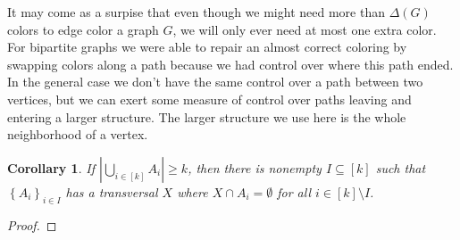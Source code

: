 \documentclass[openany]{tufte-book} %
\theoremstyle{plain}
\newtheorem{corollary}{Corollary}
\newcommand{\set}[1]{\left\{ #1 \right\}}
\newcommand{\card}[1]{\left|#1\right|}
\newcommand{\irange}[1]{\left[#1\right]}
\begin{document}
It may come as a surpise that even though we might need more than $\Delta(G)$ colors to edge color a graph $G$, we will only ever need at most one extra color.
For bipartite graphs we were able to repair an almost correct coloring by swapping colors along a path because we had control over where this path ended.  In the
general case we don't have the same control over a path between two vertices, but we can exert some measure of control over paths leaving and entering a larger structure. 
The larger structure we use here is the whole neighborhood of a vertex.

\begin{corollary}\label{TransversalCorollary}
If $\card{\bigcup_{i \in \irange{k}} A_i} \ge k$, then there is nonempty $I \subseteq \irange{k}$ such that $\set{A_i}_{i \in I}$ has a transversal $X$ where $X \cap A_i = \emptyset$
for all $i \in \irange{k} \setminus I$.
\end{corollary}
\begin{proof}
\end{proof}
\end{document}
